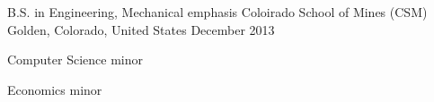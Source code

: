 

\begin{cventries}

  \cventry
    {B.S. in Engineering, Mechanical emphasis} %
    {Coloirado School of Mines (CSM)} %
    {Golden, Colorado, United States} %
    {December 2013} %
    {
      \begin{cvitems} %
        \item {Computer Science minor}
        \item {Economics minor}
      \end{cvitems}
    }

\end{cventries}

